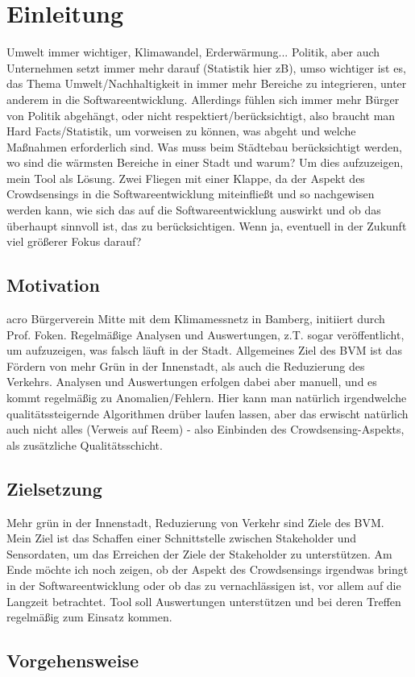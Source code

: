 \chapter{Einleitung} %
Umwelt immer wichtiger, Klimawandel, Erderwärmung... Politik, aber auch Unternehmen setzt immer mehr darauf (Statistik hier zB), umso wichtiger ist es, das Thema Umwelt/Nachhaltigkeit 
in immer mehr Bereiche zu integrieren, unter anderem in die Softwareentwicklung. Allerdings fühlen sich immer mehr Bürger von Politik abgehängt, oder nicht 
respektiert/berücksichtigt, also braucht man Hard Facts/Statistik, um vorweisen zu können, was abgeht und welche Maßnahmen erforderlich sind. Was muss beim Städtebau berücksichtigt werden, wo sind die wärmsten 
Bereiche in einer Stadt und warum? Um dies aufzuzeigen, mein Tool als Lösung. Zwei Fliegen mit einer Klappe, da der Aspekt des Crowdsensings in die Softwareentwicklung miteinfließt und so nachgewisen werden kann, wie sich das
auf die Softwareentwicklung auswirkt und ob das überhaupt sinnvoll ist, das zu berücksichtigen. Wenn ja, eventuell in der Zukunft viel größerer Fokus darauf?

\section{Motivation}
\ac{acro} Bürgerverein Mitte mit dem Klimamessnetz in Bamberg, initiiert durch Prof. Foken. Regelmäßige Analysen und Auswertungen, z.T. sogar veröffentlicht, um aufzuzeigen, was falsch läuft in der Stadt. Allgemeines Ziel des BVM ist das Fördern von mehr Grün in der Innenstadt, als auch die 
Reduzierung des Verkehrs. Analysen und Auswertungen erfolgen dabei aber manuell, und 
es kommt regelmäßig zu Anomalien/Fehlern. Hier kann man natürlich irgendwelche qualitätssteigernde Algorithmen drüber laufen lassen, aber das erwischt natürlich auch nicht alles (Verweis auf Reem) - also Einbinden des Crowdsensing-Aspekts, als zusätzliche Qualitätsschicht.

\section{Zielsetzung}
Mehr grün in der Innenstadt, Reduzierung von Verkehr sind Ziele des BVM. Mein Ziel ist das Schaffen einer Schnittstelle zwischen Stakeholder und Sensordaten, um das Erreichen der Ziele der Stakeholder zu unterstützen. Am Ende möchte ich noch zeigen, ob der Aspekt des Crowdsensings irgendwas bringt in der Softwareentwicklung oder ob
das zu vernachlässigen ist, vor allem auf die Langzeit betrachtet. Tool soll Auswertungen unterstützen und bei deren Treffen regelmäßig zum Einsatz kommen.
\section{Vorgehensweise}
